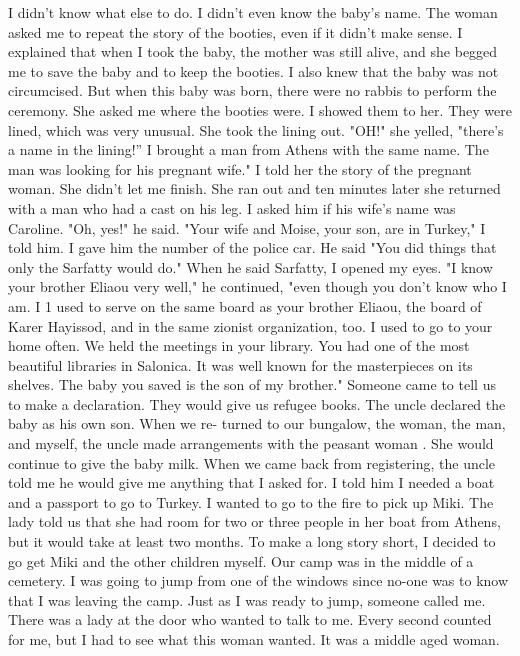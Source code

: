 I 
didn't know what else to do.
I didn't even know the baby's name.
The woman asked me to repeat the story of the booties, even if it didn't make sense.
I explained that when I took the baby, the mother was still alive, and she begged me to save the baby and to keep the booties.
I also knew 
that the baby was not circumcised.
But when this baby was born, there were no rabbis to perform the ceremony.
She asked me where the booties were.
I showed them to her.
They 
were lined, which was very unusual.
She took the lining out.
"OH!"
she 
yelled, "there's a name in the lining!” I brought a man from Athens with 
the same name.
The man was looking for his pregnant wife."
I told her 
the story of the pregnant woman.
She didn't let me finish.
She ran out 
and ten minutes later she returned with a man who had a cast on his leg.
I asked him if his wife's name was Caroline.
"Oh, yes!"
he said.
"Your 
wife and Moise, your son, are in Turkey," I told him.
I gave him the 
number of the police car.
He said "You did things that only the Sarfatty 
would do."
When he said Sarfatty, I opened my eyes.
"I know your brother 
Eliaou very well," he continued, "even though you don't know who I am.
I 
1 
used to serve on the same board as your brother Eliaou, the board of Karer 
Hayissod, and in the same zionist organization, too.
I used to go to your 
home often.
We held the meetings in your library.
You had one of the 
most beautiful libraries in Salonica.
It was well known for the masterpieces on its shelves.
The baby you saved is the son of my brother."
Someone came to tell us to make a declaration.
They would give us refugee books.
The uncle declared the baby as his own son.
When we re-
turned to our bungalow, the woman, the man, and myself, the uncle made 
arrangements with the peasant woman .
She would continue to give the baby milk.
When we came back from registering, the uncle told me he would give me anything that I asked for.
I told him I needed a boat and a passport to go to Turkey.
I wanted to go to the fire to pick up Miki.
The lady told us that she had room for two or three people in her boat from Athens, but it 
would take at least two months.
To make a long story short, I decided 
to go get Miki and the other children myself.
Our camp was in the middle of a cemetery.
I was going to jump from 
one of the windows since no-one was to know that I was leaving the camp.
Just as I was ready to jump, someone called me.
There was a lady at the 
door who wanted to talk to me.
Every second counted for me, but I had 
to see what this woman wanted.
It was a middle aged woman.
